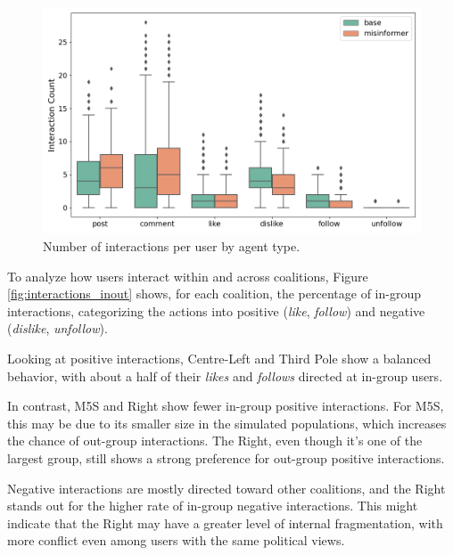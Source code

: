 \begin{figure}[h]
    \centering
    \includegraphics[width=1\linewidth]{Images/Interactions/count_per_user_DefaultRecSys.png}
    \caption{Number of interactions per user by agent type.}
    \label{fig:interactions_count}
\end{figure}

\medskip
To analyze how users interact within and across coalitions, Figure \ref{fig:interactions_inout} shows, for each coalition, the percentage of in-group interactions, categorizing the actions into positive (\textit{like}, \textit{follow}) and negative (\textit{dislike}, \textit{unfollow}).

Looking at positive interactions, Centre-Left and Third Pole show a balanced behavior, with about a half of their \textit{likes} and \textit{follows} directed at in-group users.

In contrast, M5S and Right show fewer in-group positive interactions. 
For M5S, this may be due to its smaller size in the simulated populations, which increases the chance of out-group interactions.
The Right, even though it's one of the largest group, still shows a strong preference for out-group positive interactions.

Negative interactions are mostly directed toward other coalitions, and the Right stands out for the higher rate of in-group negative interactions.
This might indicate that the Right may have a greater level of internal fragmentation, with more conflict even among users with the same political views.


